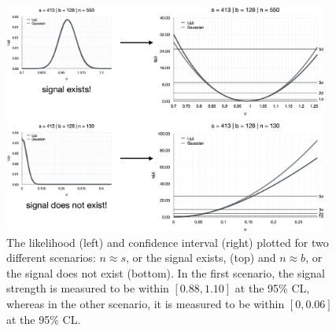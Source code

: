 \begin{figure}[htb]
    \centering
    \includegraphics[width=0.95\textwidth]{fig/stats/CL_examples.png}
    \caption[The likelihood and confidence interval plotted for the ``signal exists'' and ``signal does not exist'' scenarios]{
        The likelihood (left) and confidence interval (right) plotted for two different scenarios: $n \approx s$, or the signal exists, (top) and $n \approx b$, or the signal does not exist (bottom). 
        In the first scenario, the signal strength is measured to be within $[0.88, 1.10]$ at the 95\% CL, whereas in the other scenario, it is measured to be within $[0, 0.06]$ at the 95\% CL.
    }
    \label{fig:CL_examples}
\end{figure}

